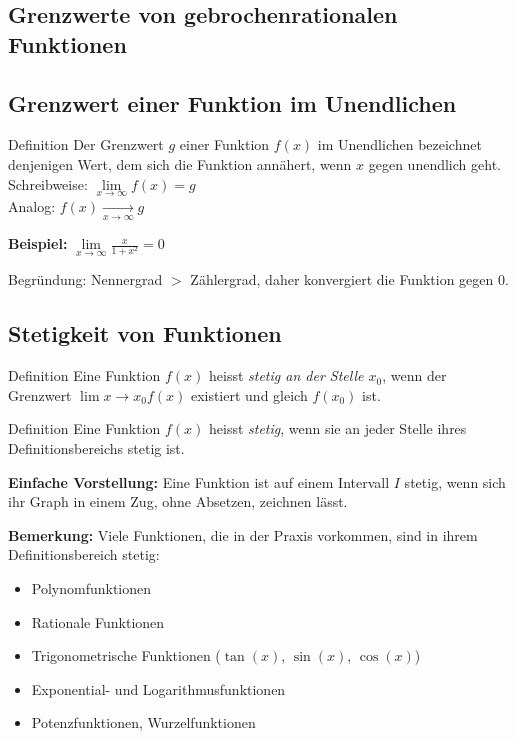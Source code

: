 \subsection{Grenzwerte von gebrochenrationalen Funktionen}\label{subsec:grenzwerte-gebrochenrationalen-funktionen}

\subsection{Grenzwert einer Funktion im Unendlichen}\label{subsec:grenzwert-funktion-im-unendlichen}

\begin{definition}{Definition}
    Der Grenzwert $g$ einer Funktion $f(x)$ im Unendlichen bezeichnet denjenigen Wert, dem sich die Funktion annähert, wenn $x$ gegen unendlich geht.\\

    Schreibweise: $\lim \limits_{x \rightarrow \infty} f(x) = g$\\
    Analog: $f(x) \underset{x \rightarrow\infty}{\longrightarrow} g$
\end{definition}

\textbf{Beispiel:} $\lim \limits_{x \rightarrow \infty} \frac{x}{1 + x^2} = 0$

\RIGHTarrow Begründung: Nennergrad $>$ Zählergrad, daher konvergiert die Funktion gegen 0.

\subsection{Stetigkeit von Funktionen}\label{subsec:stetigkeit}

\begin{definition}{Definition}
    Eine Funktion $f(x)$ heisst \emph{stetig an der Stelle $x_0$}, wenn der Grenzwert $\lim \limits{x \rightarrow x_0} f(x)$ existiert und gleich $f(x_0)$ ist.
\end{definition}

\begin{definition}{Definition}
    Eine Funktion $f(x)$ heisst \emph{stetig}, wenn sie an jeder Stelle ihres Definitionsbereichs stetig ist.
\end{definition}

\textbf{Einfache Vorstellung:} Eine Funktion ist auf einem Intervall $I$ stetig, wenn sich ihr Graph in einem Zug, ohne Absetzen, zeichnen lässt.

\textbf{Bemerkung:} Viele Funktionen, die in der Praxis vorkommen, sind in ihrem Definitionsbereich stetig:
\begin{itemize}
    \item Polynomfunktionen
    \item Rationale Funktionen
    \item Trigonometrische Funktionen ($\tan(x)$, $\sin(x)$, $\cos(x)$)
    \item Exponential- und Logarithmusfunktionen
    \item Potenzfunktionen, Wurzelfunktionen
\end{itemize}

